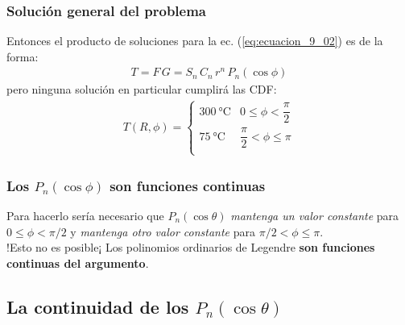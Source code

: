 \documentclass[12pt]{beamer}
\begin{document}
\begin{frame}
\frametitle{Solución general del problema}
Entonces el producto de soluciones para la ec. (\ref{eq:ecuacion_9_02}) es de la forma:
\pause
\begin{align}
T = F \, G = S_{n} \, C_{n} \, r^{n} \, P_{n} (\cos \phi)
\label{eq:ecuacion_9_14}
\end{align}
pero ninguna solución en particular cumplirá las CDF:
\begin{align}
T(R, \phi) = \begin{cases}
\SI{300}{\degreeCelsius} & 0 \leq \phi < \dfrac{\pi}{2} \\
\SI{75}{\degreeCelsius} & \dfrac{\pi}{2} < \phi \leq \pi \\
\end{cases}
\label{eq:ecuacion_9_15}
\end{align}
\end{frame}
\begin{frame}
\frametitle{Los $P_{n}(\cos \phi)$ son funciones continuas}
Para hacerlo sería necesario que $P_{n} (\cos \theta)$ \emph{mantenga un valor constante} para $0 \leq \phi < \pi/2$ \pause y \emph{mantenga otro valor constante} para $\pi/2 < \phi \leq \pi$.
\\
\bigskip
\pause
!Esto no es posible¡ \pause Los polinomios ordinarios de Legendre \textbf{son funciones continuas del argumento}.
\end{frame}

\subsection{La continuidad de los \texorpdfstring{$P_{n}(\cos \theta)$}{Pn(cos t)}}
\end{document}
